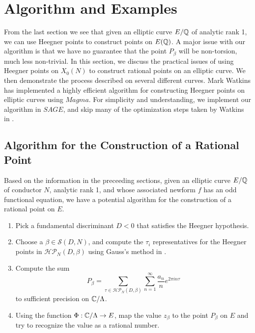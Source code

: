 \chapter{Algorithm and Examples}
From the last section we see that given an elliptic curve $E/\mathbb{Q}$ of analytic rank 1, we can use Heegner points to construct points on $E(\mathbb{Q})$. A major issue with our algorithm is that we have no guarantee that the point $P_\beta$ will be non-torsion, much less non-trivial. In this section, we discuss the practical issues of using Heegner points on $X_0(N)$ to construct rational points on an elliptic curve. We then demonstrate the process described on several different curves. Mark Watkins has implemented a highly efficient algorithm for constructing Heegner points on elliptic curves using $Magma$. For simplicity and understanding, we implement our algorithm in $SAGE$, and skip many of the optimization steps taken by Watkins in \cite{Watkins}.


\section{Algorithm for the Construction of a Rational Point}
Based on the information in the preceeding sections, given an elliptic curve $E/\mathbb{Q}$ of conductor $N$, analytic rank 1, and whose associated newform $f$ has an odd functional equation, we have a potential algorithm for the construction of a rational point on $E$.
\begin{enumerate}
\item{} Pick a fundamental discriminant $D < 0$ that satisfies the Heegner hypothesis. 
\item{} Choose a $\beta \in \mathcal{S}(D,N)$, and compute the $\tau_i$ representatives for the Heegner points in $\mathcal{HP}_N(D,\beta)$ using Gauss's method in \cite[Section 5.9]{Cohen}. 
\item{} Compute the sum
$$P_\beta = \sum_{\tau \in \mathcal{HP}_N(D,\beta)} \sum_{n=1}^{\infty} \frac{a_n}{n}e^{2\pi i n \tau}$$
to sufficient precision on $\mathbb{C}/\Lambda$.
\item{} Using the function $\Phi:\mathbb{C}/\Lambda \to E$, map the value $z_\beta$ to the point $P_\beta$ on $E$ and try to recognize the value as a rational number.
\end{enumerate}

